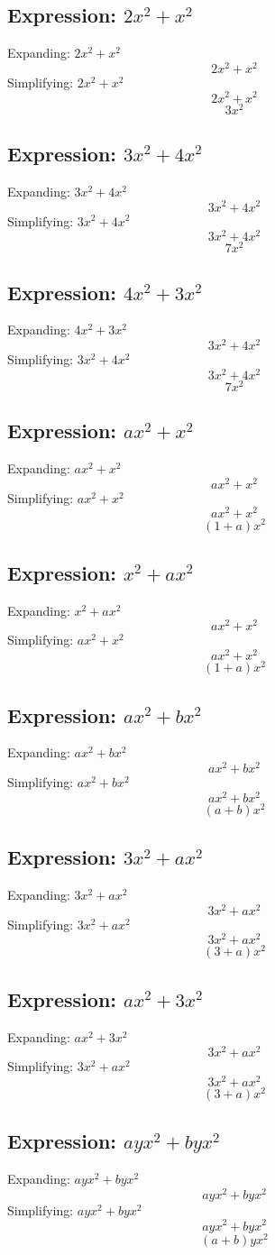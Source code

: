 \documentclass[10pt]{article}
\begin{document}
\subsection*{Expression: $2x^{2} + x^{2}$}
Expanding: $2x^{2} + x^{2}$
$$2x^{2} + x^{2}$$
Simplifying: $2x^{2} + x^{2}$
$$2x^{2} + x^{2}$$
$$3x^{2}$$
\subsection*{Expression: $3x^{2} + 4x^{2}$}
Expanding: $3x^{2} + 4x^{2}$
$$3x^{2} + 4x^{2}$$
Simplifying: $3x^{2} + 4x^{2}$
$$3x^{2} + 4x^{2}$$
$$7x^{2}$$
\subsection*{Expression: $4x^{2} + 3x^{2}$}
Expanding: $4x^{2} + 3x^{2}$
$$3x^{2} + 4x^{2}$$
Simplifying: $3x^{2} + 4x^{2}$
$$3x^{2} + 4x^{2}$$
$$7x^{2}$$
\subsection*{Expression: $ax^{2} + x^{2}$}
Expanding: $ax^{2} + x^{2}$
$$ax^{2} + x^{2}$$
Simplifying: $ax^{2} + x^{2}$
$$ax^{2} + x^{2}$$
$$(1 + a)x^{2}$$
\subsection*{Expression: $x^{2} + ax^{2}$}
Expanding: $x^{2} + ax^{2}$
$$ax^{2} + x^{2}$$
Simplifying: $ax^{2} + x^{2}$
$$ax^{2} + x^{2}$$
$$(1 + a)x^{2}$$
\subsection*{Expression: $ax^{2} + bx^{2}$}
Expanding: $ax^{2} + bx^{2}$
$$ax^{2} + bx^{2}$$
Simplifying: $ax^{2} + bx^{2}$
$$ax^{2} + bx^{2}$$
$$(a + b)x^{2}$$
\subsection*{Expression: $3x^{2} + ax^{2}$}
Expanding: $3x^{2} + ax^{2}$
$$3x^{2} + ax^{2}$$
Simplifying: $3x^{2} + ax^{2}$
$$3x^{2} + ax^{2}$$
$$(3 + a)x^{2}$$
\subsection*{Expression: $ax^{2} + 3x^{2}$}
Expanding: $ax^{2} + 3x^{2}$
$$3x^{2} + ax^{2}$$
Simplifying: $3x^{2} + ax^{2}$
$$3x^{2} + ax^{2}$$
$$(3 + a)x^{2}$$
\subsection*{Expression: $ayx^{2} + byx^{2}$}
Expanding: $ayx^{2} + byx^{2}$
$$ayx^{2} + byx^{2}$$
Simplifying: $ayx^{2} + byx^{2}$
$$ayx^{2} + byx^{2}$$
$$(a + b)yx^{2}$$
\end{document}

